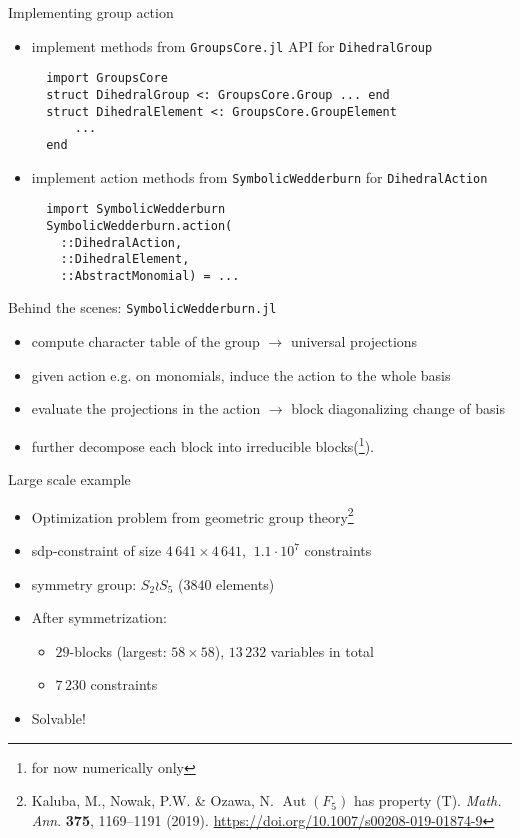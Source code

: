 \begin{frame}[fragile]{Implementing group action}
  \begin{itemize}
  \normalsize
    \item implement methods from \texttt{GroupsCore.jl} API for \texttt{DihedralGroup}
  \footnotesize
  \begin{verbatim}
  import GroupsCore
  struct DihedralGroup <: GroupsCore.Group ... end
  struct DihedralElement <: GroupsCore.GroupElement
      ...
  end
  \end{verbatim}
  \normalsize
  \item implement action methods from \texttt{SymbolicWedderburn} for \texttt{DihedralAction}
  \footnotesize
  \begin{verbatim}
  import SymbolicWedderburn
  SymbolicWedderburn.action(
    ::DihedralAction, 
    ::DihedralElement,
    ::AbstractMonomial) = ...
  \end{verbatim}
  \end{itemize}
  
\end{frame}

\begin{frame}{Behind the scenes: \texttt{SymbolicWedderburn.jl}}
    \begin{itemize}
      \item compute \alert{character table} of the group $\longrightarrow$ universal projections
      \item given action e.g. on monomials, \alert{induce} the action to the whole basis
      \item evaluate the projections in the action $\longrightarrow$ \alert{block diagonalizing} change of basis
      \item further \alert{decompose} each block into \alert{irreducible} blocks(\footnote{for now numerically only}).
    \end{itemize}
\end{frame}


\begin{frame}{Large scale example}

  \begin{itemize}
    \item Optimization problem from geometric group theory\footnote{Kaluba, M., Nowak, P.W. \& Ozawa, N. $\operatorname{Aut}(F_5)$ has property (T). \textit{Math. Ann}. \textbf{375}, 1169–1191 (2019). \url{https://doi.org/10.1007/s00208-019-01874-9}}
    \item sdp-constraint of size $4\,641\times 4\,641$, $~1.1\cdot 10^7$ constraints
    \item symmetry group: $S_2 \wr S_5$ ($3840$ elements)
    \item After symmetrization:
      \begin{itemize}
        \item $29$-blocks (largest: $58\times 58$), $13\,232$ variables in total
        \item $7\,230$ constraints
      \end{itemize}
    \item Solvable!
  \end{itemize}

\end{frame}

